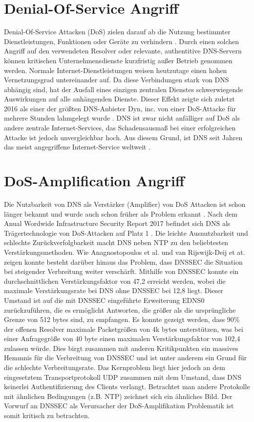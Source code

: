 \section{Denial-Of-Service Angriff}

Denial-Of-Service Attacken (DoS) zielen darauf ab die Nutzung bestimmter Dienstleistungen, Funktionen oder Geräte zu verhindern \cite{BSIG040}. Durch einen solchen Angriff auf den verwendeten Resolver oder relevante, authentitive DNS-Servern können kritischen Unternehmensdienste kurzfristig außer Betrieb genommen werden. Normale Internet-Dienstleistungen weisen heutzutage einen hohen Vernetzungsgrad untereinander auf. Da diese Verbindungen stark von DNS abhängig sind, hat der Ausfall eines einzigen zentralen Dienstes schwerwiegende Auswirkungen auf alle anhängenden Dienste. Dieser Effekt zeigte sich zuletzt 2016 als einer der größten DNS-Anbieter Dyn, inc. von einer DoS-Attacke für mehrere Stunden lahmgelegt wurde \cite{Krebs2016}. DNS ist zwar nicht anfälliger auf DoS als andere zentrale Internet-Services, das Schadensausmaß bei einer erfolgreichen Attacke ist jedoch unvergleichbar hoch. Aus diesem Grund, ist DNS seit Jahren das meist angegriffene Internet-Service weltweit \cite{Alcoy2017}. 

\section{DoS-Amplification Angriff}
\label{sec:attack-dosamp}

Die Nutzbarkeit von DNS als Verstärker (Amplifier) von DoS Attacken ist schon länger bekannt und wurde auch schon früher als Problem erkannt \cite{ICANN2006}. Nach dem Anual Wordwide Infrastructure Security Report 2017 befindet sich DNS als Trägertechnologie von DoS-Attacken auf Platz 1 \cite{Alcoy2017}. Die leichte Ausnutzbarkeit und schlechte Zurückverfolgbarkeit macht DNS neben NTP zu den beliebtesten Verstärkungsmethoden. Wie Anagnostopoulos et al.\cite{Anagnostopoulos2013} und van Rijswijk-Deij et at.\cite{VanRijswijk-Deij2014} zeigen konnte besteht darüber hinaus das Problem, dass DNSSEC die Situation bei steigender Verbreitung weiter verschärft. Mithilfe von DNSSEC konnte ein durchschnittlichen Verstärkungsfaktor von 47,2 erreicht werden, wobei die maximale Verstärkungsrate bei DNS ohne DNSSEC bei 12,8 liegt. Dieser Umstand ist auf die mit DNSSEC eingeführte Erweiterung EDNS0 zurückzuführen, die es ermöglicht Antworten, die größer als die ursprüngliche Grenze von 512 bytes sind, zu empfangen. Es konnte gezeigt werden, dass 90\% der offenen Resolver maximale Packetgrößen von 4k bytes unterstützen, was bei einer Anfragegröße von 40 byte einen maximalen Verstärkungsfaktor von 102,4 zulassen würde. Dies birgt zusammen mit anderen Kritikpunkten ein massives Hemmnis für die Verbreitung von DNSSEC und ist unter anderem ein Grund für die schlechte Verbreitungsrate. Das Kernproblem liegt hier jedoch an dem eingesetztem Transportprotokoll UDP zusammen mit dem Umstand, dass DNS keinerlei Authentifizierung des Clients verlangt. Betrachtet man andere Protokolle mit ähnlichen Bedingungen (z.B. NTP) zeichnet sich ein ähnliches Bild. Der Vorwurf an DNSSEC als Verursacher der DoS-Amplifikation Problematik ist somit kritisch zu betrachten.

